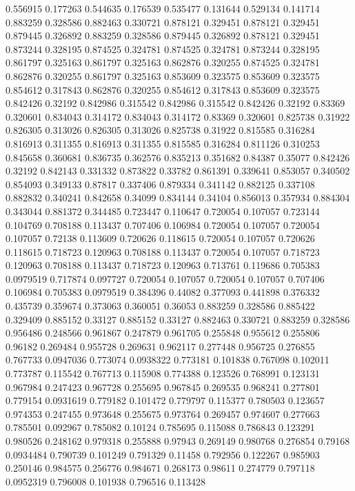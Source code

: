 0.556915 0.177263
0.544635 0.176539
0.535477 0.131644
0.529134 0.141714
0.883259 0.328586
0.882463 0.330721
0.878121 0.329451
0.878121 0.329451
0.879445 0.326892
0.883259 0.328586
0.879445 0.326892
0.878121 0.329451
0.873244 0.328195
0.874525 0.324781
0.874525 0.324781
0.873244 0.328195
0.861797 0.325163
0.861797 0.325163
0.862876 0.320255
0.874525 0.324781
0.862876 0.320255
0.861797 0.325163
0.853609 0.323575
0.853609 0.323575
0.854612 0.317843
0.862876 0.320255
0.854612 0.317843
0.853609 0.323575
0.842426 0.32192
0.842986 0.315542
0.842986 0.315542
0.842426 0.32192
0.83369 0.320601
0.834043 0.314172
0.834043 0.314172
0.83369 0.320601
0.825738 0.31922
0.826305 0.313026
0.826305 0.313026
0.825738 0.31922
0.815585 0.316284
0.816913 0.311355
0.816913 0.311355
0.815585 0.316284
0.811126 0.310253
0.845658 0.360681
0.836735 0.362576
0.835213 0.351682
0.84387 0.35077
0.842426 0.32192
0.842143 0.331332
0.873822 0.33782
0.861391 0.339641
0.853057 0.340502
0.854093 0.349133
0.87817 0.337406
0.879334 0.341142
0.882125 0.337108
0.882832 0.340241
0.842658 0.34099
0.834144 0.34104
0.856013 0.357934
0.884304 0.343044
0.881372 0.344485
0.723447 0.110647
0.720054 0.107057
0.723144 0.104769
0.708188 0.113437
0.707406 0.106984
0.720054 0.107057
0.720054 0.107057
0.72138 0.113609
0.720626 0.118615
0.720054 0.107057
0.720626 0.118615
0.718723 0.120963
0.708188 0.113437
0.720054 0.107057
0.718723 0.120963
0.708188 0.113437
0.718723 0.120963
0.713761 0.119686
0.705383 0.0979519
0.717874 0.097727
0.720054 0.107057
0.720054 0.107057
0.707406 0.106984
0.705383 0.0979519
0.384396 0.44082
0.377093 0.441898
0.376332 0.435739
0.359674 0.373063
0.360051 0.36053
0.883259 0.328586
0.885422 0.329409
0.885152 0.33127
0.885152 0.33127
0.882463 0.330721
0.883259 0.328586
0.956486 0.248566
0.961867 0.247879
0.961705 0.255848
0.955612 0.255806
0.96182 0.269484
0.955728 0.269631
0.962117 0.277448
0.956725 0.276855
0.767733 0.0947036
0.773074 0.0938322
0.773181 0.101838
0.767098 0.102011
0.773787 0.115542
0.767713 0.115908
0.774388 0.123526
0.768991 0.123131
0.967984 0.247423
0.967728 0.255695
0.967845 0.269535
0.968241 0.277801
0.779154 0.0931619
0.779182 0.101472
0.779797 0.115377
0.780503 0.123657
0.974353 0.247455
0.973648 0.255675
0.973764 0.269457
0.974607 0.277663
0.785501 0.092967
0.785082 0.10124
0.785695 0.115088
0.786843 0.123291
0.980526 0.248162
0.979318 0.255888
0.97943 0.269149
0.980768 0.276854
0.79168 0.0934484
0.790739 0.101249
0.791329 0.11458
0.792956 0.122267
0.985903 0.250146
0.984575 0.256776
0.984671 0.268173
0.98611 0.274779
0.797118 0.0952319
0.796008 0.101938
0.796516 0.113428
